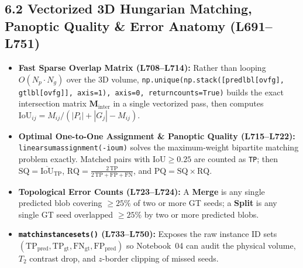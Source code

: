 \documentclass[10pt,a4paper]{article}
\renewcommand{\_}{\origunderscore\allowbreak}
\begin{document}
\subsection*{6.2 Vectorized 3D Hungarian Matching, Panoptic Quality \& Error Anatomy (L691--L751)}
\begin{annotbox}
\begin{itemize}
    \item \textbf{Fast Sparse Overlap Matrix (L708--L714):} Rather than looping $O(N_p \cdot N_g)$ over the 3D volume, \texttt{np.unique(np.stack([pred\_lbl[ov\_fg], gt\_lbl[ov\_fg]], axis=1), axis=0, return\_counts=True)} builds the exact intersection matrix $\mathbf{M}_{\text{inter}}$ in a single vectorized pass, then computes $\text{IoU}_{ij} = M_{ij} / (|P_i| + |G_j| - M_{ij})$.
    \item \textbf{Optimal One-to-One Assignment \& Panoptic Quality (L715--L722):} \texttt{linear\_sum\_assignment(-iou\_m)} solves the maximum-weight bipartite matching problem exactly. Matched pairs with $\text{IoU} \ge 0.25$ are counted as \texttt{TP}; then $\text{SQ} = \overline{\text{IoU}}_{\text{TP}}$, $\text{RQ} = \frac{2\,\text{TP}}{2\,\text{TP} + \text{FP} + \text{FN}}$, and $\text{PQ} = \text{SQ} \times \text{RQ}$.
    \item \textbf{Topological Error Counts (L723--L724):} A \textbf{Merge} is any single predicted blob covering $\ge 25\%$ of two or more GT seeds; a \textbf{Split} is any single GT seed overlapped $\ge 25\%$ by two or more predicted blobs.
    \item \textbf{\texttt{match\_instance\_sets()} (L733--L750):} Exposes the raw instance ID sets $(\text{TP}_{\text{pred}}, \text{TP}_{\text{gt}}, \text{FN}_{\text{gt}}, \text{FP}_{\text{pred}})$ so Notebook~04 can audit the physical volume, $T_2$ contrast drop, and $z$-border clipping of missed seeds.
\end{itemize}
\end{annotbox}
\end{document}
